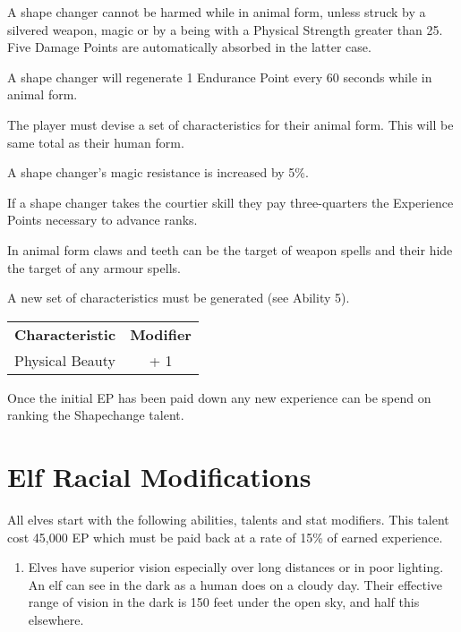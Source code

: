 \documentclass[a4paper]{article}
\begin{document}
\begin{multicols*}{3}
\begin{Enumerate}
\item
A shape changer cannot be harmed while in animal form, unless struck
by a silvered weapon, magic or by a being with a Physical Strength
greater than 25. Five Damage Points are automatically absorbed in the
latter case.

\item
A shape changer will regenerate 1 Endurance Point every 60 seconds
while in animal form.

\item
The player must devise a set of characteristics for their animal form.
This will be same total as their human form.

\item
A shape changer's magic resistance is increased by 5\%.

\item
If a shape changer takes the courtier skill they pay three-quarters
the Experience Points necessary to advance ranks.

\item
  In animal form claws and teeth can be the target of weapon spells
  and their hide the target of any armour spells.
  
\end{Enumerate}

A new set of characteristics must be generated (see Ability 5).

\begin{tabularx}{\linewidth}{Xc}
\textbf{Characteristic} & \textbf{Modifier} \\
Physical Beauty		& + 1 \\
\end{tabularx}

Once the initial EP has been paid down any new experience can be spend
on ranking the Shapechange talent.

  
\section{Elf Racial Modifications}

All elves start with the following abilities, talents and stat
modifiers.  This talent cost 45,000 EP which must be paid back at a
rate of 15\% of earned experience.
				   
\begin{enumerate}
\item
Elves have superior vision especially over long distances or in poor
lighting.  An elf can see in the dark as a human does on a cloudy
day. Their effective range of vision in the dark is 150 feet under the
open sky, and half this elsewhere.


\end{enumerate}
\end{multicols*}
\end{document}
